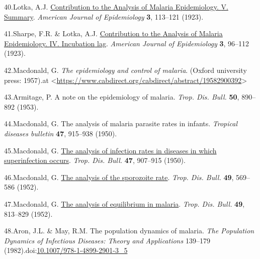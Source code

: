 \documentclass[
]{book}
\newlength{\cslhangindent}
\newlength{\cslentryspacingunit} %
\newenvironment{CSLReferences}[2] %
 {%
  \setlength{\parindent}{0pt}
  \ifodd #1
  \let\oldpar\par
  \def\par{\hangindent=\cslhangindent\oldpar}
  \fi
  \setlength{\parskip}{#2\cslentryspacingunit}
 }%
 {}
\begin{document}
\begin{CSLReferences}{0}{0}
\leavevmode{}%
40.Lotka, A.J. \href{https://doi.org/10.1093/oxfordjournals.aje.a118964}{Contribution to the {Analysis} of {Malaria} {Epidemiology}. {V}. {Summary}}. \emph{American Journal of Epidemiology} \textbf{3}, 113--121 (1923).

\leavevmode{}%
41.Sharpe, F.R. \& Lotka, A.J. \href{https://doi.org/10.1093/oxfordjournals.aje.a118967}{Contribution to the {Analysis} of {Malaria} {Epidemiology}. {IV}. {Incubation} lag}. \emph{American Journal of Epidemiology} \textbf{3}, 96--112 (1923).

\leavevmode{}%
42.Macdonald, G. \emph{The epidemiology and control of malaria}. (Oxford university press: 1957).at \textless{}\url{https://www.cabdirect.org/cabdirect/abstract/19582900392}\textgreater{}

\leavevmode{}%
43.Armitage, P. A note on the epidemiology of malaria. \emph{Trop. Dis. Bull.} \textbf{50}, 890--892 (1953).

\leavevmode{}%
44.Macdonald, G. The analysis of malaria parasite rates in infants. \emph{Tropical diseases bulletin} \textbf{47}, 915--938 (1950).

\leavevmode{}%
45.Macdonald, G. \href{https://www.ncbi.nlm.nih.gov/pubmed/14798656}{The analysis of infection rates in diseases in which superinfection occurs}. \emph{Trop. Dis. Bull.} \textbf{47}, 907--915 (1950).

\leavevmode{}%
46.Macdonald, G. \href{https://www.ncbi.nlm.nih.gov/pubmed/14958825}{The analysis of the sporozoite rate}. \emph{Trop. Dis. Bull.} \textbf{49}, 569--586 (1952).

\leavevmode{}%
47.Macdonald, G. \href{https://www.ncbi.nlm.nih.gov/pubmed/12995455}{The analysis of equilibrium in malaria}. \emph{Trop. Dis. Bull.} \textbf{49}, 813--829 (1952).

\leavevmode{}%
48.Aron, J.L. \& May, R.M. The population dynamics of malaria. \emph{The {Population} {Dynamics} of {Infectious} {Diseases}: {Theory} and {Applications}} 139--179 (1982).doi:\href{https://doi.org/10.1007/978-1-4899-2901-3_5}{10.1007/978-1-4899-2901-3\_5}


\end{CSLReferences}
\end{document}
